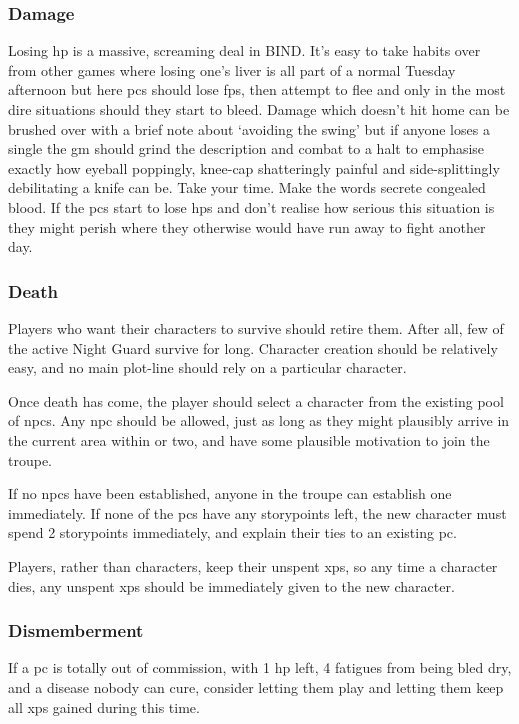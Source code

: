 \begin{multicols}{2}
\subsubsection{Damage}

Losing \gls{hp} is a massive, screaming deal in BIND.
It's easy to take habits over from other games where losing one's liver is all part of a normal Tuesday afternoon but here \glspl{pc} should lose \glspl{fp}, then attempt to flee and only in the most dire situations should they start to bleed.
Damage which doesn't hit home can be brushed over with a brief note about `avoiding the swing' but if anyone loses a single  the \gls{gm} should grind the description and combat to a halt to emphasise exactly how eyeball poppingly, knee-cap shatteringly painful and side-splittingly debilitating a knife can be.
Take your time.
Make the words secrete congealed blood.
If the \glspl{pc} start to lose \glspl{hp} and don't realise how serious this situation is they might perish where they otherwise would have run away to fight another day.

\subsubsection{Death}
\label{pcdeath}

Players who want their characters to survive should retire them.
After all, few of the active Night Guard survive for long.
Character creation should be relatively easy, and no main plot-line should rely on a particular character.

Once death has come, the player should select a character from the existing pool of \glspl{npc}\iftoggle{stories}{brought into the world with \glspl{storypoint}}{}.
Any \gls{npc} should be allowed, just as long as they might plausibly arrive in the current area within  or two, and have some plausible motivation to join the troupe.

If no \glspl{npc} have been established, anyone in the troupe can establish one immediately.
If none of the \glspl{pc} have any \glspl{storypoint} left, the new character must spend 2 \glspl{storypoint} immediately, and explain their ties to an existing \gls{pc}.

Players, rather than characters, keep their unspent \glspl{xp}, so any time a character dies, any unspent \glspl{xp} should be immediately given to the new character.

\subsubsection{Dismemberment}

If a \gls{pc} is totally out of commission, with 1 \gls{hp} left, 4 \glspl{fatigue} from being bled dry, and a disease nobody can cure, consider letting them play  and letting them keep all \glspl{xp} gained during this time.

\end{multicols}

